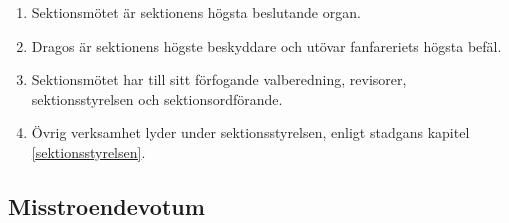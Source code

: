 \documentclass[11pt,a4paper]{article}
\begin{document}
\begin{enumerate}[\thesubsection .1]

   \item Sektionsmötet är sektionens högsta beslutande organ.

   \item Dragos är sektionens högste beskyddare och utövar
   fanfareriets högsta befäl.

   \item Sektionsmötet har till sitt förfogande valberedning,
   revisorer, sektionsstyrelsen och sektionsordförande.

   \item Övrig verksamhet lyder under sektionsstyrelsen, enligt stadgans kapitel \ref{sektionsstyrelsen}.

\end{enumerate}

\subsection{Misstroendevotum}
\label{subsec:misstroende}
\end{document}

